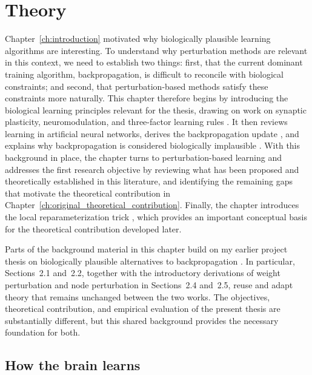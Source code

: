 \section{Theory}
\label{ch:theory}

Chapter~\ref{ch:introduction} motivated why biologically plausible learning algorithms are interesting. To understand why perturbation methods are relevant in this context, we need to establish two things: first, that the current dominant training algorithm, backpropagation, is difficult to reconcile with biological constraints; and second, that perturbation-based methods satisfy these constraints more naturally. This chapter therefore begins by introducing the biological learning principles relevant for the thesis, drawing on work on synaptic plasticity, neuromodulation, and three-factor learning rules \parencite{hebb_organization_1949,schultz_neural_1997,fremaux_neuromodulated_2016,gerstner_eligibility_2018}. It then reviews learning in artificial neural networks, derives the backpropagation update \parencite{rumelhart_learning_1986}, and explains why backpropagation is considered biologically implausible \parencite{crick_recent_1989,lillicrap_backpropagation_2020}. With this background in place, the chapter turns to perturbation-based learning \parencite{williams_simple_1992,werfel_learning_2003,hiratani_stability_2022,zuge_weight_2023} and addresses the first research objective by reviewing what has been proposed and theoretically established in this literature, and identifying the remaining gaps that motivate the theoretical contribution in Chapter~\ref{ch:original_theoretical_contribution}. Finally, the chapter introduces the local reparameterization trick \parencite{kingma_variational_2015}, which provides an important conceptual basis for the theoretical contribution developed later.

Parts of the background material in this chapter build on my earlier project thesis on biologically plausible alternatives to backpropagation \parencite{martinussen_biologically_2025}. In particular, Sections~2.1 and~2.2, together with the introductory derivations of weight perturbation and node perturbation in Sections~2.4 and~2.5, reuse and adapt theory that remains unchanged between the two works. The objectives, theoretical contribution, and empirical evaluation of the present thesis are substantially different, but this shared background provides the necessary foundation for both.

\subsection{How the brain learns}

